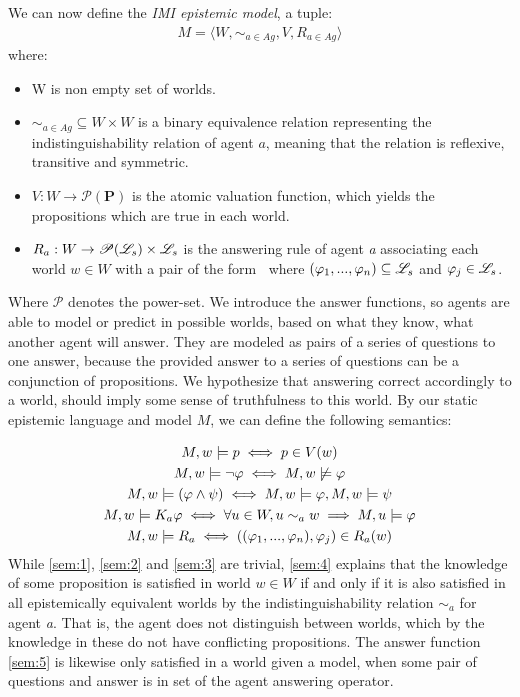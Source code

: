 We can now define the \textit{IMI epistemic model}, a tuple:
\begin{align}
	M = \langle W, \sim_{a\in Ag}, V, R_{a\in Ag}\rangle \label{eq:3}
\end{align}
where:
\begin{itemize}
	\setlength\itemsep{-0.4em}
	\item W is non empty set of worlds.
	\item $\sim_{a\in Ag} \subseteq W \times W$ is a binary equivalence relation representing the indistinguishability relation of agent $a$, meaning that the relation is reflexive, transitive and symmetric.
	\item $V : W \rightarrow \mathscr{P}(\mathbf{P})$ is the atomic valuation function, which yields the propositions which are true in each world.
	\item $R_a : W \rightarrow \mathscr{P}(\mathscr{L}_s) \times \mathscr{L}_s$ is the answering rule of agent \textit{a} associating each world $w \in W$ with a pair of the form \aset $\:$ where $(\varphi_1,...,\varphi_n) \subseteq \mathscr{L}_s$ and $\varphi_j \in \mathscr{L}_s$.
\end{itemize}
Where $\mathscr{P}$ denotes the power-set. We introduce the answer functions, so agents are able to model or predict in possible worlds, based on what they know, what another agent will answer. They are modeled as pairs of a series of questions to one answer, because the provided answer to a series of questions can be a conjunction of propositions. We hypothesize that answering correct accordingly to a world, should imply some sense of truthfulness to this world. By our static epistemic language \staticlang\: and model $M$, we can define the following semantics:

\begin{gather}
	M, w |= p \iff p \in V(w) \label{sem:1}\\
	M, w |= \neg\varphi \iff M, w \not\models \varphi \label{sem:2}\\
	M, w |= (\varphi \land \psi) \iff M, w |= \varphi, M, w |= \psi \label{sem:3}\\
	M, w |= K_a\varphi \iff \forall u\in W, u \sim_{a} w \implies M, u |= \varphi \label{sem:4}\\
	M, w |= R_a \iff ((\varphi_1,...,\varphi_n), \varphi_j) \in R_a(w) \label{sem:5}
\end{gather}
While \cref{sem:1}, \cref{sem:2} and \cref{sem:3} are trivial, \cref{sem:4} explains that the knowledge of some proposition \proposition is satisfied in world $w \in W$ if and only if it is also satisfied in all epistemically equivalent worlds by the indistinguishability relation $\sim_a$ for agent \textit{a}. That is, the agent does not distinguish between worlds, which by the knowledge in these do not have conflicting propositions. The answer function \cref{sem:5} is likewise only satisfied in a world given a model, when some pair of questions and answer is in set of the agent answering operator.

